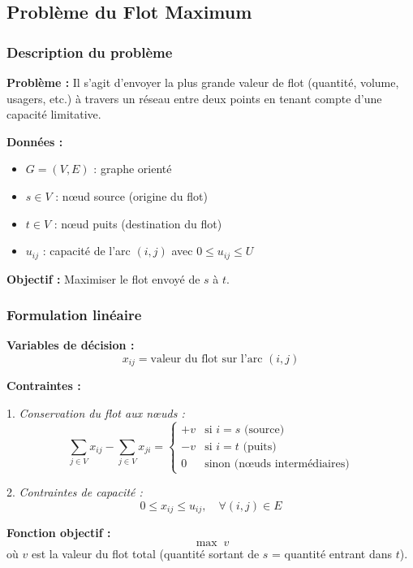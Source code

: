 \documentclass[12pt,a4paper]{article}
\begin{document}
\newpage
\subsection{Problème du Flot Maximum}

\subsubsection{Description du problème}

\begin{definition}
\textbf{Problème :} Il s'agit d'envoyer la plus grande valeur de flot (quantité, volume, usagers, etc.) à travers un réseau entre deux points en tenant compte d'une capacité limitative.

\textbf{Données :}
\begin{itemize}
    \item $G = (V, E)$ : graphe orienté
    \item $s \in V$ : nœud source (origine du flot)
    \item $t \in V$ : nœud puits (destination du flot)
    \item $u_{ij}$ : capacité de l'arc $(i,j)$ avec $0 \leq u_{ij} \leq U$
\end{itemize}

\textbf{Objectif :} Maximiser le flot envoyé de $s$ à $t$.
\end{definition}

\subsubsection{Formulation linéaire}

\begin{definition}
\textbf{Variables de décision :}
$$x_{ij} = \text{valeur du flot sur l'arc } (i,j)$$

\textbf{Contraintes :}

1. \textit{Conservation du flot aux nœuds :}
$$\sum_{j \in V} x_{ij} - \sum_{j \in V} x_{ji} = \begin{cases}
+v & \text{si } i = s \text{ (source)}\\
-v & \text{si } i = t \text{ (puits)}\\
0 & \text{sinon (nœuds intermédiaires)}
\end{cases}$$

2. \textit{Contraintes de capacité :}
$$0 \leq x_{ij} \leq u_{ij}, \quad \forall (i,j) \in E$$

\textbf{Fonction objectif :}
$$\max \; v$$
où $v$ est la valeur du flot total (quantité sortant de $s$ = quantité entrant dans $t$).
\end{definition}
\end{document}
